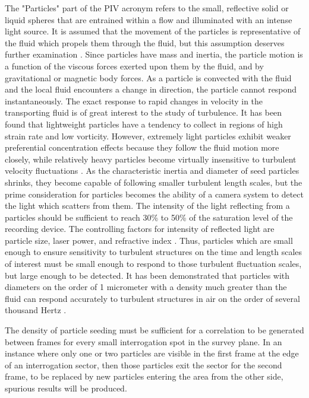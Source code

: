 The "Particles" part of the PIV acronym refers to the small, reflective solid 
or liquid spheres 
that are entrained within a flow and illuminated with 
an intense light source. It is assumed that 
the movement of the particles is representative of the fluid which propels them 
through the fluid, but this assumption deserves further examination 
\cite{roscoe1952}. Since particles have mass and inertia, the particle motion 
is a function of the viscous forces exerted upon them by the fluid, and by 
gravitational or magnetic body forces. As a particle is convected with the 
fluid and the local fluid encounters a change in direction, the particle cannot 
respond instantaneously. The exact response to rapid changes in velocity in the 
transporting fluid is of great interest to the study of turbulence. It has been 
found that lightweight 
particles have a tendency to collect in regions of high strain rate and low 
vorticity. However, extremely light particles exhibit weaker preferential 
concentration effects because they follow the fluid motion more closely, while 
relatively heavy particles become virtually insensitive to turbulent velocity 
fluctuations \cite{squires1990}. As the characteristic inertia and diameter of 
seed particles shrinks, they 
become capable of following 
smaller turbulent length scales, but the prime consideration for particles 
becomes the ability of a camera system to detect the light which scatters from 
them. The intensity of the light reflecting from a 
particles should be sufficient to reach 30\% to 50\% of the saturation level of 
the recording device. The controlling factors for intensity of reflected light 
are particle size, laser power, and refractive index \cite{adrian2011}. Thus, 
particles which are small enough to ensure sensitivity to turbulent structures 
on the time and length scales of interest must be small enough to respond to 
those turbulent fluctuation scales, but large enough to be detected. It has 
been demonstrated that particles with diameters on the order of 1 micrometer 
with a density much greater than the fluid can respond accurately to turbulent 
structures in air on the order of several thousand Hertz \cite{mei1996}.

The density of particle seeding must be sufficient for a correlation to be 
generated between frames for every small interrogation spot in the survey 
plane. In an instance where only one or two particles are visible in the first 
frame at the edge of an interrogation sector, then those particles exit the 
sector for the second frame, to be replaced by new particles 
entering the area from the other side, spurious results will be produced.


